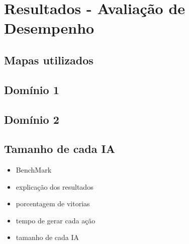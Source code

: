 
\chapter{\label{chap:ativ}Resultados - Avaliação de Desempenho}

\section{Mapas utilizados}

\section{Domínio 1}

\section{Domínio 2}

\section{Tamanho de cada IA}


\begin{itemize}
	\item BenchMark
	\item explicação dos resultados
	\item porcentagem de vitorias
	\item tempo de gerar cada ação
	\item tamanho de cada IA	
\end{itemize}

